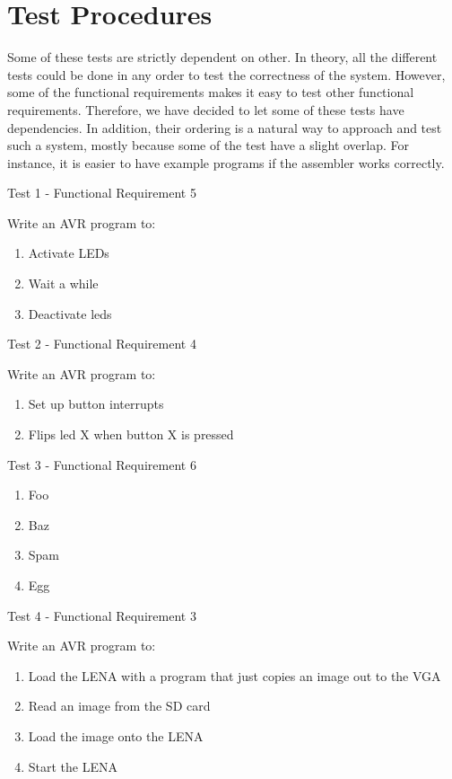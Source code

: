 \section{Test Procedures}

Some of these tests are strictly dependent on other. In theory, all the
different tests could be done in any order to test the correctness of the
system. However, some of the functional requirements makes it easy to test other
functional requirements. Therefore, we have decided to let some of these tests
have dependencies. In addition, their ordering is a natural way to approach and
test such a system, mostly because some of the test have a slight overlap. For
instance, it is easier to have example programs if the assembler works
correctly.

{\sc Test 1 - Functional Requirement 5}

{\em \FRV}
Write an AVR program to:
\begin{enumerate}
\item Activate LEDs
\item Wait a while
\item Deactivate leds
\end{enumerate}

{\sc Test 2 - Functional Requirement 4}

{\em \FRIV}
Write an AVR program to:
\begin{enumerate}
\item Set up button interrupts
\item Flips led X when button X is pressed
\end{enumerate}

{\sc Test 3 - Functional Requirement 6}

{\em \FRVI}

\begin{enumerate}
\item Foo
\item Baz
\item Spam
\item Egg
\end{enumerate}

{\sc Test 4 - Functional Requirement 3}

{\em \FRIII}
Write an AVR program to:
\begin{enumerate}
\item Load the LENA with a program that just copies an image out to the VGA
\item Read an image from the SD card
\item Load the image onto the LENA
\item Start the LENA
\end{enumerate}

